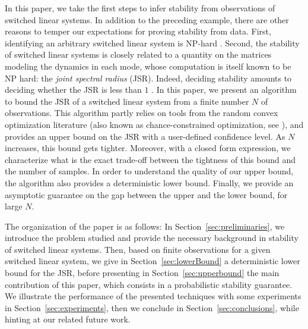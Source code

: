In this paper, we take the first steps to infer stability from observations of switched linear systems. In addition to the preceding example, there are other reasons to temper our expectations for proving stability from data. First,  identifying an arbitrary switched linear system is NP-hard \cite{jungers_lncis}. Second, the stability of switched linear systems is closely related to a quantity on the matrices modeling the dynamics in each mode, whose computation is itself known to be NP hard: the \emph{joint spectral radius} (JSR). Indeed, deciding stability amounts to deciding whether the JSR is less than $1$ \cite{jungers_lncis}. In this paper, we present an algorithm to bound the JSR of a switched linear system from a finite number $N$ of observations. This algorithm partly relies on tools from the random convex optimization literature (also known as chance-constrained optimization, see \cite{campi,nemirovski,campi-garatti}), and provides an upper bound on the JSR with a user-defined confidence level. As $N$ increases, this bound gets tighter. Moreover, with a closed form expression, we characterize what is the exact trade-off between the tightness of this bound and the number of samples. In order to understand the quality of our upper bound, the algorithm also provides a deterministic lower bound. Finally, we provide an asymptotic guarantee on the gap between the upper and the lower bound, for large $N$.


The organization of the paper is as follows: In Section~\ref{sec:preliminaries}, we introduce the problem studied and provide the necessary background in stability of switched linear systems. Then, based on finite observations for a given switched linear system, we give in Section~\ref{sec:lowerBound} a deterministic lower bound for the JSR, before presenting in Section~\ref{sec:upperbound} the main contribution of this paper, which consists in a probabilistic stability guarantee. We illustrate the performance of the presented techniques with some experiments in Section~\ref{sec:experiments}, then we conclude in Section~\ref{sec:conclusions}, while hinting at our related future work.